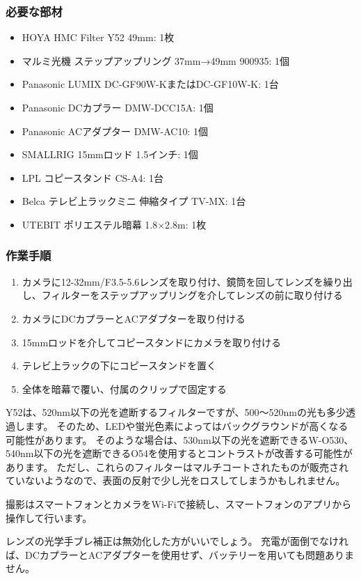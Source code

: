 \documentclass[titlepage,10pt,a4paper,uplatex]{jsbook}
\begin{document}
\subsubsection{必要な部材}
\begin{itemize}
\item HOYA HMC Filter Y52 49mm: 1枚
\item マルミ光機 ステップアップリング 37mm→49mm 900935: 1個
\item Panasonic LUMIX DC-GF90W-KまたはDC-GF10W-K: 1台
\item Panasonic DCカプラー DMW-DCC15A: 1個
\item Panasonic ACアダプター DMW-AC10: 1個
\item SMALLRIG 15mmロッド 1.5インチ: 1個
\item LPL コピースタンド CS-A4: 1台
\item Belca テレビ上ラックミニ 伸縮タイプ TV-MX: 1台
\item UTEBIT ポリエステル暗幕 1.8×2.8m: 1枚
\end{itemize}

\subsubsection{作業手順}
\begin{enumerate}
\item カメラに12-32mm/F3.5-5.6レンズを取り付け、鏡筒を回してレンズを繰り出し、フィルターをステップアップリングを介してレンズの前に取り付ける
\item カメラにDCカプラーとACアダプターを取り付ける
\item 15mmロッドを介してコピースタンドにカメラを取り付ける
\item テレビ上ラックの下にコピースタンドを置く
\item 全体を暗幕で覆い、付属のクリップで固定する
\end{enumerate}

Y52は、520nm以下の光を遮断するフィルターですが、500～520nmの光も多少透過します。
そのため、LEDや蛍光色素によってはバックグラウンドが高くなる可能性があります。
そのような場合は、530nm以下の光を遮断できるW-O530、540nm以下の光を遮断できるO54を使用するとコントラストが改善する可能性があります。
ただし、これらのフィルターはマルチコートされたものが販売されていないようなので、表面の反射で少し光をロスしてしまうかもしれません。

撮影はスマートフォンとカメラをWi-Fiで接続し、スマートフォンのアプリから操作して行います。

レンズの光学手ブレ補正は無効化した方がいいでしょう。
充電が面倒でなければ、DCカプラーとACアダプターを使用せず、バッテリーを用いても問題ありません。
\end{document}

